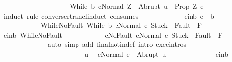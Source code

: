 \begin{isabellebody}
\ \ \ \ \ \ \ \ \ \ \ \ \ \ \ \ \ \ \ \ {\isasymGamma}{\isasymturnstile}{\isasymlangle}While\ b\ c{\isacharcomma}Normal\ Z{\isasymrangle}\ {\isasymRightarrow}\ Abrupt\ u{\isacharparenright}{\isachardoublequoteclose}\ {\isacharparenleft}\ {\isachardoublequoteopen}{\isacharquery}Prop\ Z\ e{\isachardoublequoteclose}{\isacharparenright}\isanewline
\ \ \ \ \ \ \ \ \isamarkupfalse%
\ {\isacharparenleft}induct\ rule{\isacharcolon}\ converse{\isacharunderscore}rtrancl{\isacharunderscore}induct\ {\isacharbrackleft}consumes\ {}{\isacharbrackright}{\isacharparenright}\isanewline
\ \ \ \ \ \ \ \ \ \ \isamarkupfalse%
\ e{\isacharunderscore}in{\isacharunderscore}b{\isacharcolon}\ {\isachardoublequoteopen}e\ {\isasymin}\ b{\isachardoublequoteclose}\isanewline
\ \ \ \ \ \ \ \ \ \ \isamarkupfalse%
\ WhileNoFault{\isacharcolon}\ {\isachardoublequoteopen}{\isasymGamma}{\isasymturnstile}{\isasymlangle}While\ b\ c{\isacharcomma}Normal\ e{\isasymrangle}\ {\isasymRightarrow}{\isasymnotin}{\isacharparenleft}{\isacharbraceleft}Stuck{\isacharbraceright}\ {\isasymunion}\ Fault\ {\isacharbackquote}\ {\isacharparenleft}{\isacharminus}F{\isacharparenright}{\isacharparenright}{\isachardoublequoteclose}\isanewline
\ \ \ \ \ \ \ \ \ \ \isamarkupfalse%
\ e{\isacharunderscore}in{\isacharunderscore}b\ WhileNoFault\isanewline
\ \ \ \ \ \ \ \ \ \ \isamarkupfalse%
\ cNoFault{\isacharcolon}\ {\isachardoublequoteopen}{\isasymGamma}{\isasymturnstile}{\isasymlangle}c{\isacharcomma}Normal\ e{\isasymrangle}\ {\isasymRightarrow}{\isasymnotin}{\isacharparenleft}{\isacharbraceleft}Stuck{\isacharbraceright}\ {\isasymunion}\ Fault\ {\isacharbackquote}\ {\isacharparenleft}{\isacharminus}F{\isacharparenright}{\isacharparenright}{\isachardoublequoteclose}\isanewline
\ \ \ \ \ \ \ \ \ \ \ \ \isamarkupfalse%
\ {\isacharparenleft}auto\ simp\ add{\isacharcolon}\ final{\isacharunderscore}notin{\isacharunderscore}def\ intro{\isacharcolon}\ exec{\isachardot}intros{\isacharparenright}\isanewline
\ \ \ \ \ \ \ \ \ \ \isamarkupfalse%
\isanewline
\ \ \ \ \ \ \ \ \ \ \isacommand{{\isacharbraceleft}}\isamarkupfalse%
\isanewline
\ \ \ \ \ \ \ \ \ \ \ \ \isamarkupfalse%
\ u\ \isamarkupfalse%
\ {\isachardoublequoteopen}{\isasymGamma}{\isasymturnstile}{\isasymlangle}c{\isacharcomma}Normal\ e{\isasymrangle}\ {\isasymRightarrow}\ Abrupt\ u{\isachardoublequoteclose}\isanewline
\ \ \ \ \ \ \ \ \ \ \ \ \isamarkupfalse%
\ e{\isacharunderscore}in{\isacharunderscore}b\ \isamarkupfalse%

\end{isabellebody}
